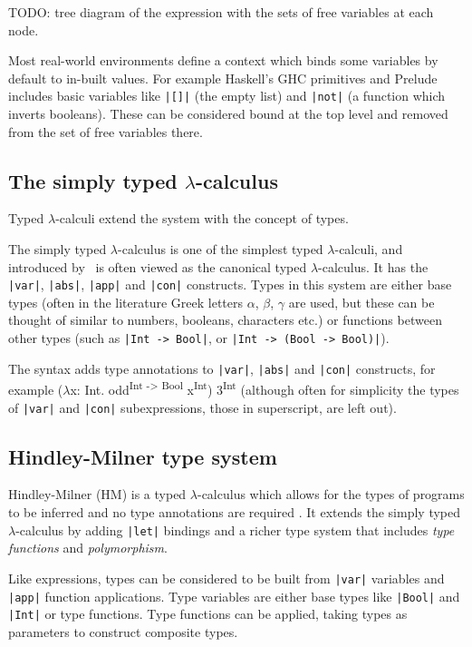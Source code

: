 \documentclass[a4paper,fleqn,12pt]{article}
\begin{document}
TODO: tree diagram of the expression with the sets of free variables at each node.

Most real-world environments define a context which binds some variables by default to in-built values. For example Haskell’s GHC primitives and Prelude includes basic variables like \texttt{|[]|} (the empty list) and \texttt{|not|} (a function which inverts booleans). These can be considered bound at the top level and removed from the set of free variables there.
\subsection{The simply typed $\lambda$-calculus}\label{id:h.w7vj0r89b86n}
Typed $\lambda$-calculi extend the system with the concept of types.

The simply typed $\lambda$-calculus is one of the simplest typed $\lambda$-calculi, and introduced by~\cite{ref11} is often viewed as the canonical typed $\lambda$-calculus. It has the \texttt{|var|}, \texttt{|abs|}, \texttt{|app|} and \texttt{|con|} constructs. Types in this system are either base types (often in the literature Greek letters $\alpha$, $\beta$, $\gamma$ are used, but these can be thought of similar to numbers, booleans, characters etc.) or functions between other types (such as \texttt{|Int -> Bool|}, or \texttt{|Int -> (Bool -> Bool)|}).

The syntax adds type annotations to \texttt{|var|}, \texttt{|abs|} and \texttt{|con|} constructs, for example ($\lambda$x: Int. odd\textsuperscript{Int -> Bool} x\textsuperscript{Int}) 3\textsuperscript{Int} (although often for simplicity the types of \texttt{|var|} and \texttt{|con|} subexpressions, those in superscript, are left out).
\subsection{Hindley-Milner type system}\label{id:h.gsouq2axz3k}
Hindley-Milner (HM) is a typed $\lambda$-calculus which allows for the types of programs to be inferred and no type annotations are required \citep{ref12,ref13}. It extends the simply typed $\lambda$-calculus by adding \texttt{|let|} bindings and a richer type system that includes \textit{type functions} and \textit{polymorphism}.

Like expressions, types can be considered to be built from \texttt{|var|} variables and \texttt{|app|} function applications. Type variables are either base types like \texttt{|Bool|} and \texttt{|Int|} or type functions. Type functions can be applied, taking types as parameters to construct composite types.
\end{document}
